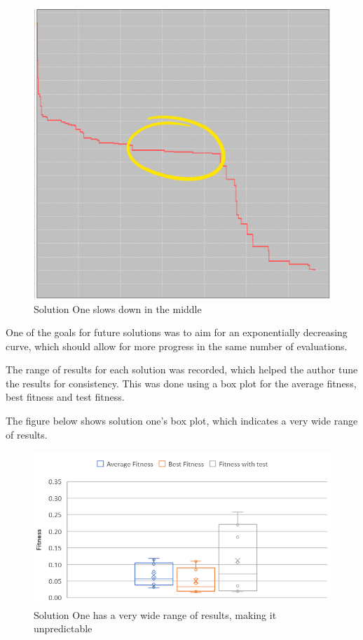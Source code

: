 \documentclass[sigconf]{acmart}
\begin{document}
\begin{figure}[H]
\includegraphics[width=\columnwidth]{SolOneGraph.png}
\caption[width=\columnwidth]{Solution One slows down in the middle} \label{SolOneGraph}
\end{figure}

One of the goals for future solutions was to aim for an exponentially decreasing curve, which should allow for more progress in the same number of evaluations.

The range of results for each solution was recorded, which helped the author tune the results for consistency. This was done using a box plot for the average fitness, best fitness and test fitness.

The figure below shows solution one's box plot, which indicates a very wide range of results.

\begin{figure}[H]
\includegraphics[width=\columnwidth]{SolOneBox.png}
\caption[width=\columnwidth]{Solution One has a very wide range of results, making it unpredictable} \label{SolOneBox}
\end{figure}
\end{document}
